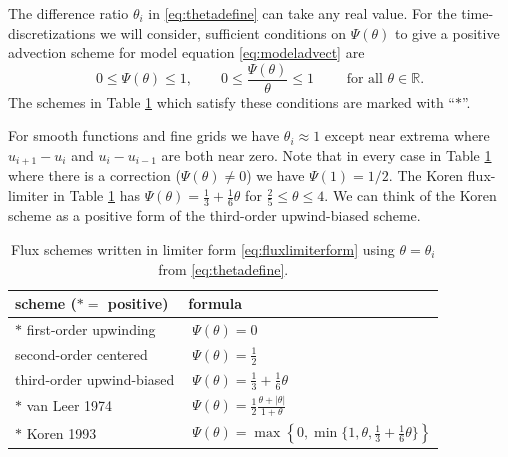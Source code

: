 \documentclass[11pt,final]{amsart}
\newcommand\RR{\mathbb{R}}
\begin{document}
The difference ratio $\theta_i$ in \eqref{eq:thetadefine} can take any real value.  For the time-discretizations we will consider, sufficient conditions on $\Psi(\theta)$ to give a positive advection scheme for model equation \eqref{eq:modeladvect} are
\begin{equation}
0 \le \Psi(\theta) \le 1, \qquad 0 \le \frac{\Psi(\theta)}{\theta} \le 1 \qquad \text{ for all } \theta \in \RR.
\end{equation}
The schemes in Table \ref{tab:fluxlimiters} which satisfy these conditions are marked with ``$\ast$''.

For smooth functions and fine grids we have $\theta_i\approx 1$ except near extrema where $u_{i+1} - u_i$ and $u_i - u_{i-1}$ are both near zero.  Note that in every case in Table \ref{tab:fluxlimiters} where there is a correction ($\Psi(\theta)\ne 0$) we have $\Psi(1)=1/2$.  The Koren flux-limiter in Table \ref{tab:fluxlimiters} \citep{HundsdorferVerwer2010} has $\Psi(\theta) = \frac{1}{3}+\frac{1}{6} \theta$ for $\frac{2}{5} \le \theta \le 4$.  We can think of the Koren scheme as a positive form of the third-order upwind-biased scheme.

\begin{table}[ht]
  \centering
  \caption{Flux schemes written in limiter form \eqref{eq:fluxlimiterform} using $\theta=\theta_i$ from \eqref{eq:thetadefine}.}
  \begin{tabular}{ll}
    \textbf{scheme ($\ast=$ positive)} & \textbf{formula} \\
\hline
    $\ast$ first-order upwinding               & $\phantom{\Big|}\Psi(\theta) = 0$ \\
    \phantom{$\ast$} second-order centered     & $\phantom{\Big|}\Psi(\theta) = \frac{1}{2}$  \\
    \phantom{$\ast$} third-order upwind-biased & $\phantom{\Big|}\Psi(\theta) = \frac{1}{3}+\frac{1}{6} \theta$  \\
    $\ast$ van Leer 1974                       & $\phantom{\Big|}\Psi(\theta) = \frac{1}{2} \frac{\theta + |\theta|}{1+\theta}$  \\
    $\ast$ Koren 1993                          & $\phantom{\Big|}\Psi(\theta) = \max\left\{0,\min\{1,\theta,\frac{1}{3}+\frac{1}{6} \theta\}\right\}$  \\
    \hline
  \end{tabular}
 \label{tab:fluxlimiters}
\end{table}
\end{document}
